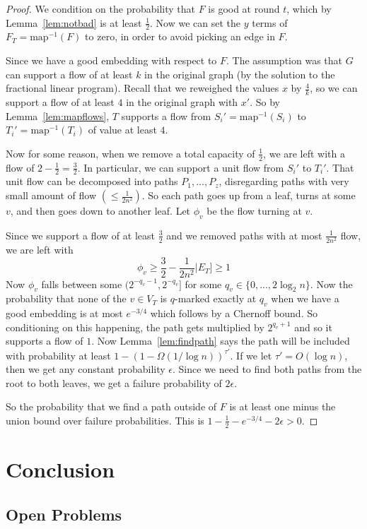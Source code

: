 \documentclass[12pt]{article}
\begin{document}
\begin{proof}
We condition on the probability that $F$ is good at round $t$, which by Lemma~\ref{lem:notbad} is at least $\frac{1}{2}$. Now we can set the $y$ terms of $F_T = \text{map}^{-1}(F)$ to zero, in order to avoid picking an edge in $F$. 

Since we have a good embedding with respect to $F$. The assumption was that $G$ can support a flow of at least $k$ in the original graph (by the solution to the fractional linear program). Recall that we reweighed the values $x$ by $\frac{4}{k}$, so we can support a flow of at least $4$ in the original graph with $x'$. So by Lemma~\ref{lem:mapflows}, $T$ supports a flow from $S_i' = \text{map}^{-1}(S_i)$ to $T_i' = \text{map}^{-1}(T_i)$ of value at least $4$. 

Now for some reason, when we remove a total capacity of $\frac{1}{2}$, we are left with a flow of $2 - \frac{1}{2} = \frac{3}{2}$. In particular, we can support a unit flow from $S_i'$ to $T_i'$. That unit flow can be decomposed into paths $P_1, ..., P_z$, disregarding paths with very small amount of flow $(\leq \frac{1}{2n^2})$. So each path goes up from a leaf, turns at some $v$, and then goes down to another leaf. Let $\phi_v$ be the flow turning at $v$. 

Since we support a flow of at least $\frac{3}{2}$ and we removed paths with at most $\frac{1}{2n^2}$ flow, we are left with
\[ \phi_v \geq \frac{3}{2} - \dfrac{1}{2n^2}|E_T] \geq 1 \]
Now $\phi_v$ falls between some $(2^{-q_v-1}, 2^{-q_v}]$ for some $q_v \in \{0, ..., 2\log_2 n\}$. Now the probability that none of the $v \in V_T$ is $q$-marked exactly at $q_v$ when we have a good embedding is at most $e^{-3/4}$ which follows by a Chernoff bound. So conditioning on this happening, the path gets multiplied by $2^{q_v+1}$ and so it supports a flow of $1$. Now Lemma~\ref{lem:findpath} says the path will be included with probability at least $1 - (1 - \Omega(1/\log n))^{\tau'}$. If we let $\tau' = O(\log n)$, then we get any constant probability $\epsilon$. Since we need to find both paths from the root to both leaves, we get a failure probability of $2\epsilon$.

So the probability that we find a path outside of $F$ is at least one minus the union bound over failure probabilities. This is $1 - \frac{1}{2} - e^{-3/4} - 2\epsilon > 0$. 
\end{proof}

\section{Conclusion}

\subsection{Open Problems}
\end{document}
